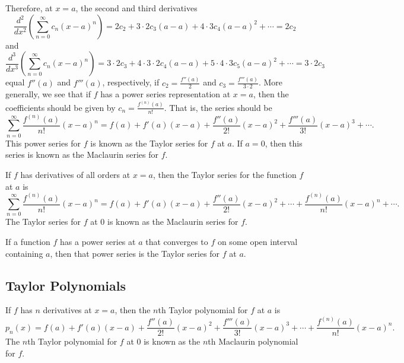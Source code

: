 \documentclass{report}
\begin{document}
    Therefore, at $x=a$, the second and third derivatives
    \begin{equation}
        \frac{d^2}{dx^2}\left(\sum_{n=0}^{\infty} c_n(x-a)^n\right) = 2c_2 + 3 \cdot 2c_3(a-a) + 4 \cdot 3c_4(a-a)^2 + \cdots = 2c_2
    \end{equation}
    and
    \begin{equation}
        \frac{d^3}{dx^3}\left(\sum_{n=0}^{\infty} c_n(x-a)^n\right) = 3 \cdot 2c_3 + 4 \cdot 3 \cdot 2c_4(a-a) + 5 \cdot 4 \cdot 3c_5(a-a)^2 + \cdots = 3 \cdot 2c_3
    \end{equation}
    equal $f''(a)$ and $f'''(a)$, respectively, if $c_2 = \frac{f''(a)}{2}$ and $c_3 = \frac{f'''(a)}{3 \cdot 2}$. More generally, we see that if $f$ has a power series representation at $x=a$, then the coefficients should be given by $c_n = \frac{f^{(n)}(a)}{n!}$. That is, the series should be
    \begin{equation}
        \sum_{n=0}^{\infty} \frac{f^{(n)}(a)}{n!}(x-a)^n = f(a) + f'(a)(x-a) + \frac{f''(a)}{2!}(x-a)^2 + \frac{f'''(a)}{3!}(x-a)^3 + \cdots.
    \end{equation}
    This power series for $f$ is known as the Taylor series for $f$ at $a$. If $a=0$, then this series is known as the Maclaurin series for $f$.
    \pagebreak 
    \begin{dfn}
        If $f$ has derivatives of all orders at $x=a$, then the Taylor series for the function $f$ at $a$ is
        \begin{equation}
            \sum_{n=0}^{\infty} \frac{f^{(n)}(a)}{n!}(x-a)^n = f(a) + f'(a)(x-a) + \frac{f''(a)}{2!}(x-a)^2 + \cdots + \frac{f^{(n)}(a)}{n!}(x-a)^n + \cdots.
        \end{equation}
        The Taylor series for $f$ at $0$ is known as the Maclaurin series for $f$.
    \end{dfn}
    \begin{thrmm}
        If a function $f$ has a power series at $a$ that converges to $f$ on some open interval containing $a$, then that power series is the Taylor series for $f$ at $a$.
    \end{thrmm}
    \bigbreak \noindent 
    \subsection*{Taylor Polynomials}
    \begin{dfn}
        If $f$ has $n$ derivatives at $x=a$, then the $n$th Taylor polynomial for $f$ at $a$ is
        \begin{equation}
            p_n(x) = f(a) + f'(a)(x-a) + \frac{f''(a)}{2!}(x-a)^2 + \frac{f'''(a)}{3!}(x-a)^3 + \cdots + \frac{f^{(n)}(a)}{n!}(x-a)^n.
        \end{equation}
        The $n$th Taylor polynomial for $f$ at $0$ is known as the $n$th Maclaurin polynomial for $f$.
    \end{dfn}
    
\end{document}
